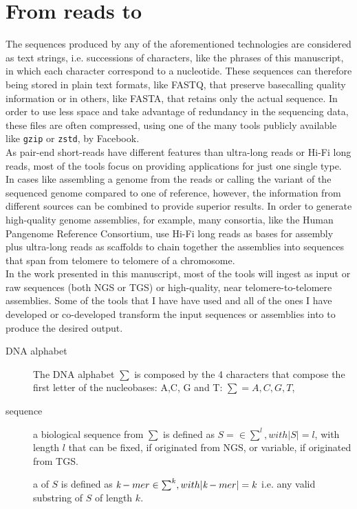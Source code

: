 \section*{From reads to \kmers}
The sequences produced by any of the aforementioned technologies are considered as text strings, i.e. successions of characters, like the phrases of this manuscript, in which each character correspond to a nucleotide. These sequences can therefore being stored in plain text formats, like FASTQ, that preserve basecalling quality information or in others, like FASTA, that retains only the actual sequence. In order to use less space and take advantage of redundancy in the sequencing data, these files are often compressed, using one of the many tools publicly available like \texttt{gzip} or \texttt{zstd}, by Facebook. \\
As pair-end short-reads have different features than ultra-long reads or Hi-Fi long reads, most of the tools focus on providing applications for just one single type. In cases like assembling a genome from the reads or calling the variant of the sequenced genome compared to one of reference, however, the information from different sources can be combined to provide superior results. In order to generate high-quality genome assemblies, for example, many consortia, like the Human Pangenome Reference Consortium, use Hi-Fi long reads as bases for assembly plus ultra-long reads as scaffolds to chain together the assemblies into sequences that span from telomere to telomere of a chromosome.\\
In the work presented in this manuscript, most of the tools will ingest as input or raw sequences (both NGS or TGS) or high-quality, near telomere-to-telomere assemblies. Some of the tools that I have have used and all of the ones I have developed or co-developed transform the input sequences or assemblies into \kmers to produce the desired output. \\
\begin{description}
	\item[DNA alphabet] The DNA alphabet $\sum$ is composed by the 4 characters that compose the first letter of the nucleobases: A,C, G and T: $ \sum = {A, C, G, T}$, 
	\item[sequence] a biological sequence from $\sum$ is defined as $ S =\in \sum^{l}, with \lvert S \rvert = l $, with length $l$ that can be fixed, if originated from NGS, or variable, if originated from TGS.
	\item[\kmer] a \kmer of $S$ is defined as $ \emph{k}-mer \in \sum^{k}, with \lvert \emph{k}-mer \rvert = k  $ i.e. any valid substring of $S$ of length $k$. 
\end{description}
